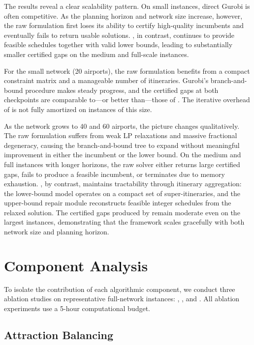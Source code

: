 The results reveal a clear scalability pattern. On small instances, direct Gurobi is often competitive. As the planning horizon and network size increase, however, the raw formulation first loses its ability to certify high-quality incumbents and eventually fails to return usable solutions. \algoNotation, in contrast, continues to provide feasible schedules together with valid lower bounds, leading to substantially smaller certified gaps on the medium and full-scale instances.

For the small network (20 airports), the raw formulation benefits from a compact constraint matrix and a manageable number of itineraries. Gurobi's branch-and-bound procedure makes steady progress, and the certified gaps at both checkpoints are comparable to---or better than---those of \algoNotation. The iterative overhead of \algoNotation is not fully amortized on instances of this size.

As the network grows to 40 and 60 airports, the picture changes qualitatively. The raw formulation suffers from weak LP relaxations and massive fractional degeneracy, causing the branch-and-bound tree to expand without meaningful improvement in either the incumbent or the lower bound. On the medium and full instances with longer horizons, the raw solver either returns large certified gaps, fails to produce a feasible incumbent, or terminates due to memory exhaustion. \algoNotation, by contrast, maintains tractability through itinerary aggregation: the lower-bound model operates on a compact set of super-itineraries, and the upper-bound repair module reconstructs feasible integer schedules from the relaxed solution. The certified gaps produced by \algoNotation remain moderate even on the largest instances, demonstrating that the framework scales gracefully with both network size and planning horizon.

\section{Component Analysis}
\label{sec:component_analysis}

To isolate the contribution of each algorithmic component, we conduct three ablation studies on representative full-network instances: , , and . All ablation experiments use a 5-hour computational budget.

\subsection{Attraction Balancing}

